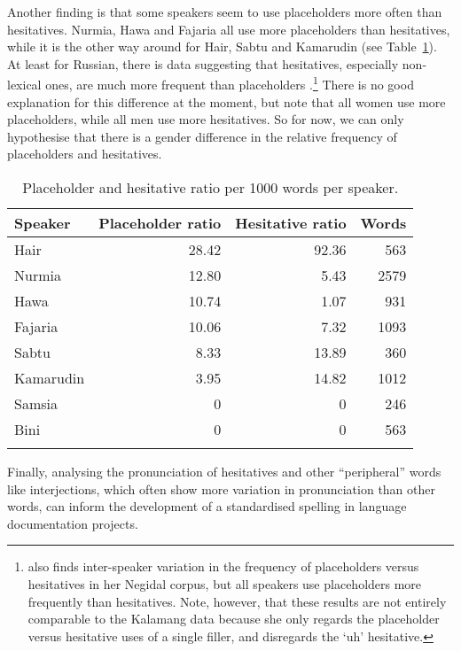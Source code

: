 \documentclass[output=paper,colorlinks,citecolor=brown
\ChapterDOI{10.5281/zenodo.15697587}
]{langscibook}
\begin{document}
Another finding is that some speakers seem to use placeholders more often than hesitatives. Nurmia, Hawa and Fajaria all use more placeholders than hesitatives, while it is the other way around for Hair, Sabtu and Kamarudin (see Table~\ref{tab:ph+hesspk}). At least for Russian, there is data suggesting that hesitatives, especially non-lexical ones, are much more frequent than placeholders \citep{kibrik2009}.\footnote{\citet{chapters/pakendorf} also finds inter-speaker variation in the frequency of placeholders versus hesitatives in her Negidal corpus, but all speakers use placeholders more frequently than hesitatives. Note, however, that these results are not entirely comparable to the Kalamang data because she only regards the placeholder versus hesitative uses of a single filler, and disregards the `uh' hesitative.} There is no good explanation for this difference at the moment, but note that all women use more placeholders, while all men use more hesitatives. So for now, we can only hypothesise that there is a gender difference in the relative frequency of placeholders and hesitatives.

\begin{table}[h!]
	\caption{Placeholder and hesitative ratio per 1000 words per speaker.}
	\label{tab:ph+hesspk}
		\begin{tabular}{lrrr}
			\lsptoprule
            Speaker& Placeholder ratio & Hesitative ratio  & Words \\
			\midrule
            Hair &	28.42 &	92.36 & 563\\
            Nurmia & 12.80 & 5.43 & 2579\\
            Hawa & 10.74& 1.07 & 931\\
            Fajaria & 10.06 & 7.32 & 1093\\
            Sabtu &	8.33 &	13.89 & 360\\
            Kamarudin &	3.95 & 14.82 & 1012\\
            Samsia&0&0 & 246\\
            Bini&0&0 & 563\\\lspbottomrule
		\end{tabular}
\end{table}


Finally, analysing the pronunciation of hesitatives and other ``peripheral'' words like interjections, which often show more variation in pronunciation than other words, can inform the development of a standardised spelling in language documentation projects.
\end{document}
